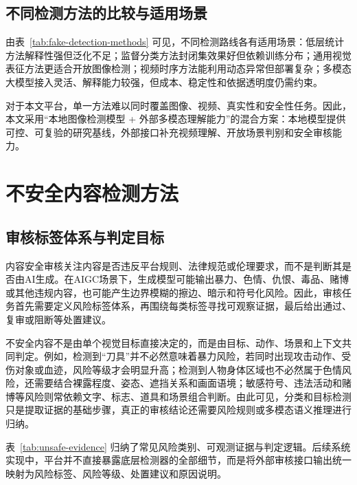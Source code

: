 \subsection{不同检测方法的比较与适用场景}

由表~\ref{tab:fake-detection-methods} 可见，不同检测路线各有适用场景：低层统计方法解释性强但泛化不足；监督分类方法封闭集效果好但依赖训练分布；通用视觉表征方法更适合开放图像检测；视频时序方法能利用动态异常但部署复杂；多模态大模型接入灵活、解释能力较强，但成本、稳定性和依据透明度仍需约束。

对于本文平台，单一方法难以同时覆盖图像、视频、真实性和安全性任务。因此，本文采用“本地图像检测模型 + 外部多模态理解能力”的混合方案：本地模型提供可控、可复验的研究基线，外部接口补充视频理解、开放场景判别和安全审核能力。

\section{不安全内容检测方法}

\subsection{审核标签体系与判定目标}

内容安全审核关注内容是否违反平台规则、法律规范或伦理要求，而不是判断其是否由AI生成。在AIGC场景下，生成模型可能输出暴力、色情、仇恨、毒品、赌博或其他违规内容，也可能产生边界模糊的擦边、暗示和符号化风险。因此，审核任务首先需要定义风险标签体系，再围绕每类标签寻找可观察证据，最后给出通过、复审或阻断等处置建议。

不安全内容不是由单个视觉目标直接决定的，而是由目标、动作、场景和上下文共同判定。例如，检测到“刀具”并不必然意味着暴力风险，若同时出现攻击动作、受伤对象或血迹，风险等级才会明显升高；检测到人物身体区域也不必然属于色情风险，还需要结合裸露程度、姿态、遮挡关系和画面语境；敏感符号、违法活动和赌博等风险则常依赖文字、标志、道具和场景组合判断。由此可见，分类和目标检测只是提取证据的基础步骤，真正的审核结论还需要风险规则或多模态语义推理进行归纳。

表~\ref{tab:unsafe-evidence} 归纳了常见风险类别、可观测证据与判定逻辑。后续系统实现中，平台并不直接暴露底层检测器的全部细节，而是将外部审核接口输出统一映射为风险标签、风险等级、处置建议和原因说明。

